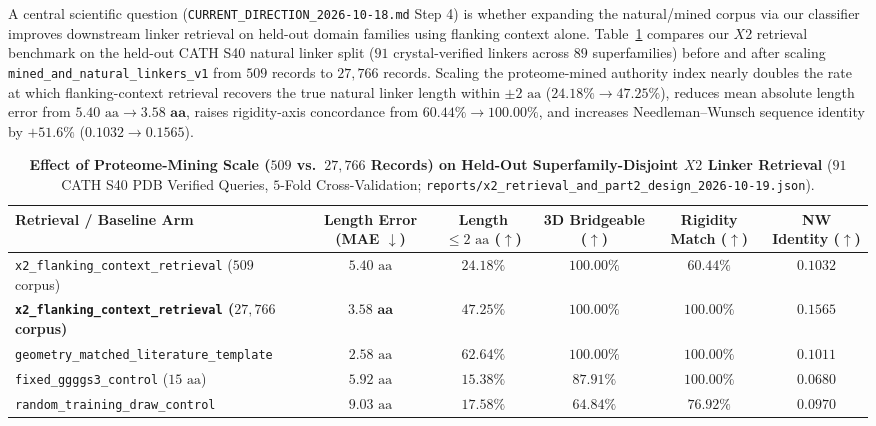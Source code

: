 \documentclass[11pt]{article}
\begin{document}
A central scientific question (\texttt{CURRENT\_DIRECTION\_2026-10-18.md} Step 4) is whether expanding the natural/mined corpus via our classifier improves downstream linker retrieval on held-out domain families using flanking context alone. Table~\ref{tab:part2_scaling} compares our $X2$ retrieval benchmark on the held-out CATH S40 natural linker split ($91$ crystal-verified linkers across $89$ superfamilies) before and after scaling \texttt{mined\_and\_natural\_linkers\_v1} from $509$ records to $27{,}766$ records. Scaling the proteome-mined authority index nearly doubles the rate at which flanking-context retrieval recovers the true natural linker length within $\pm 2\text{ aa}$ ($24.18\% \to \mathbf{47.25\%}$), reduces mean absolute length error from $5.40\text{ aa} \to \mathbf{3.58\text{ aa}}$, raises rigidity-axis concordance from $60.44\% \to \mathbf{100.00\%}$, and increases Needleman--Wunsch sequence identity by $+51.6\%$ ($0.1032 \to \mathbf{0.1565}$).

\begin{table}[h]
\centering
\caption{\textbf{Effect of Proteome-Mining Scale ($509$ vs.\ $27{,}766$ Records) on Held-Out Superfamily-Disjoint $X2$ Linker Retrieval} ($91$ CATH S40 PDB Verified Queries, $5$-Fold Cross-Validation; \texttt{reports/x2\_retrieval\_and\_part2\_design\_2026-10-19.json}).}
\label{tab:part2_scaling}
\small
\begin{tabular}{l c c c c c}
\toprule
\textbf{Retrieval / Baseline Arm} & \textbf{Length Error (MAE $\downarrow$)} & \textbf{Length $\le 2\text{ aa}$ ($\uparrow$)} & \textbf{3D Bridgeable ($\uparrow$)} & \textbf{Rigidity Match ($\uparrow$)} & \textbf{NW Identity ($\uparrow$)} \\
\midrule
\texttt{x2\_flanking\_context\_retrieval} ($509$ corpus) & $5.40\text{ aa}$ & $24.18\%$ & $100.00\%$ & $60.44\%$ & $0.1032$ \\
\textbf{\texttt{x2\_flanking\_context\_retrieval} ($27{,}766$ corpus)} & $\mathbf{3.58\text{ aa}}$ & $\mathbf{47.25\%}$ & $\mathbf{100.00\%}$ & $\mathbf{100.00\%}$ & $\mathbf{0.1565}$ \\
\texttt{geometry\_matched\_literature\_template} & $2.58\text{ aa}$ & $62.64\%$ & $100.00\%$ & $100.00\%$ & $0.1011$ \\
\texttt{fixed\_ggggs3\_control} ($15\text{ aa}$) & $5.92\text{ aa}$ & $15.38\%$ & $87.91\%$ & $100.00\%$ & $0.0680$ \\
\texttt{random\_training\_draw\_control} & $9.03\text{ aa}$ & $17.58\%$ & $64.84\%$ & $76.92\%$ & $0.0970$ \\
\bottomrule
\end{tabular}
\end{table}
\end{document}
